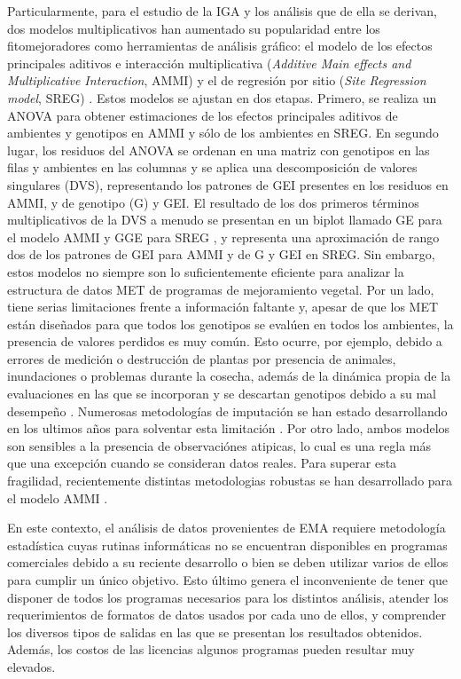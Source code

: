 Particularmente, para el estudio de la IGA y los análisis que de ella se derivan, dos modelos multiplicativos han aumentado su popularidad entre los fitomejoradores como herramientas de análisis gráfico: el modelo de los efectos principales aditivos e interacción multiplicativa (\emph{Additive Main effects and Multiplicative Interaction}, AMMI) \citep{Kempton1984,Gauch1988} y el de regresión por sitio (\emph{Site Regression model}, SREG) \citep{Corneliusetal1996, GauchZobel1997}. Estos modelos se ajustan en dos etapas. Primero, se realiza un ANOVA para obtener estimaciones de los efectos principales aditivos de ambientes y genotipos en AMMI y sólo de los ambientes en SREG. En segundo lugar, los residuos del ANOVA se ordenan en una matriz con genotipos en las filas y ambientes en las columnas y se aplica una descomposición de valores singulares (DVS), representando los patrones de GEI presentes en los residuos en AMMI, y de genotipo (G) y GEI. El resultado de los dos primeros términos multiplicativos de la DVS a menudo se presentan en un biplot llamado GE para el modelo AMMI y GGE para SREG \citep{YanHunt2002}, y representa una aproximación de rango dos de los patrones de GEI para AMMI y de G y GEI en SREG. Sin embargo, estos modelos no siempre son lo suficientemente eficiente para analizar la estructura de datos MET de programas de mejoramiento vegetal. Por un lado, tiene serias limitaciones frente a información faltante y, apesar de que los MET están diseñados para que todos los genotipos se evalúen en todos los ambientes, la presencia de valores perdidos es muy común. Esto ocurre, por ejemplo, debido a errores de medición o destrucción de plantas por presencia de animales, inundaciones o problemas durante la cosecha, además de la dinámica propia de la evaluaciones en las que se incorporan y se descartan genotipos debido a su mal desempeño \citep{HillRosenberg1985}. Numerosas metodologías de imputación se han estado desarrollando en los ultimos años para solventar esta limitación \citep{Alarconetal2010, Alarconetal2014}. Por otro lado, ambos modelos son sensibles a la presencia de observaciónes atipicas, lo cual es una regla más que una excepción cuando se consideran datos reales. Para superar esta fragilidad, recientemente distintas metodologias robustas se han desarrollado para el modelo AMMI \citep{Rodriguesetal2016}. 


En este contexto, el análisis de datos provenientes de EMA requiere metodología estadística cuyas rutinas informáticas no se encuentran disponibles en programas comerciales debido a su reciente desarrollo o bien se deben utilizar varios de ellos para cumplir un único objetivo. Esto último genera el inconveniente de tener que disponer de todos los programas necesarios para los distintos análisis, atender los requerimientos de formatos de datos usados por cada uno de ellos, y comprender los diversos tipos de salidas en las que se presentan los resultados obtenidos. Además, los costos de las licencias algunos programas pueden resultar muy elevados. 

